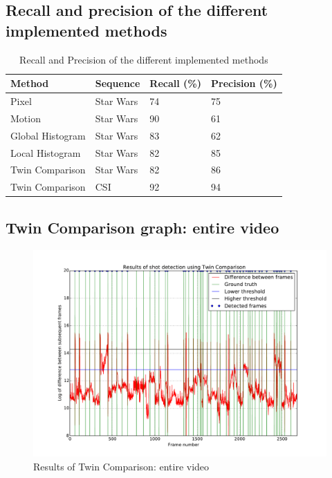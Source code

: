 \begin{appendices}
\subsection{Recall and precision of the different implemented methods}\label{app:q3-1}
\begin{table}[h]
\centering
\caption{Recall and Precision of the different implemented methods}
\label{tab:precisionrecall}
\begin{tabular}{|l|l|l|l|}
\hline
\textbf{Method}  & \textbf{Sequence} & \textbf{Recall (\%)} & \textbf{Precision (\%)} \\ \hline
Pixel            & Star Wars       & 74                   & 75                      \\ \hline
Motion           & Star Wars       & 90                   & 61                      \\ \hline
Global Histogram & Star Wars       & 83                   & 62                      \\ \hline
Local Histogram  & Star Wars       & 82                   & 85                      \\ \hline
Twin Comparison  & Star Wars       & 82                   & 86                      \\ \hline
Twin Comparison  & CSI               & 92                   & 94                      \\ \hline
\end{tabular}
\end{table}

\clearpage
\subsection{Twin Comparison graph: entire video}
\label{app:entire}

\begin{figure}[!ht]
  \centering
  \includegraphics[page=1,angle=90,height=0.9\textheight,keepaspectratio]{figs/graph_entire_video}
  \caption{Results of Twin Comparison: entire video}
  \label{fig:entire}
\end{figure}


\end{appendices}
